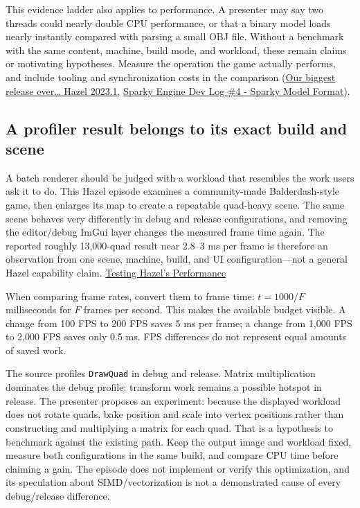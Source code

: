 This evidence ladder also applies to performance. A presenter may say two threads could nearly double CPU performance, or that a binary model loads nearly instantly compared with parsing a small OBJ file. Without a benchmark with the same content, machine, build mode, and workload, these remain claims or motivating hypotheses. Measure the operation the game actually performs, and include tooling and synchronization costs in the comparison (\href{https://www.youtube.com/watch?v=L_XLGmG2Ct8&t=1m12s}{Our biggest release ever\ldots{} Hazel 2023.1}, \href{https://www.youtube.com/watch?v=EUy8G3uMitI&t=4m30s}{Sparky Engine Dev Log \#4 - Sparky Model Format}).

\subsection{A profiler result belongs to its exact build and scene}\label{06-engine-ii-ch041-a-profiler-result-belongs-to-its-exact-build-and-scene}

A batch renderer should be judged with a workload that resembles the work users ask it to do. This Hazel episode examines a community-made Balderdash-style game, then enlarges its map to create a repeatable quad-heavy scene. The same scene behaves very differently in debug and release configurations, and removing the editor/debug ImGui layer changes the measured frame time again. The reported roughly 13,000-quad result near 2.8--3 ms per frame is therefore an observation from one scene, machine, build, and UI configuration---not a general Hazel capability claim. \href{https://www.youtube.com/watch?v=Yw7RpvmqvSE}{Testing Hazel's Performance}

When comparing frame rates, convert them to frame time: \(t=1000/F\) milliseconds for \(F\) frames per second. This makes the available budget visible. A change from 100 FPS to 200 FPS saves 5 ms per frame; a change from 1,000 FPS to 2,000 FPS saves only 0.5 ms. FPS differences do not represent equal amounts of saved work.

The source profiles \texttt{DrawQuad} in debug and release. Matrix multiplication dominates the debug profile; transform work remains a possible hotspot in release. The presenter proposes an experiment: because the displayed workload does not rotate quads, bake position and scale into vertex positions rather than constructing and multiplying a matrix for each quad. That is a hypothesis to benchmark against the existing path. Keep the output image and workload fixed, measure both configurations in the same build, and compare CPU time before claiming a gain. The episode does not implement or verify this optimization, and its speculation about SIMD/vectorization is not a demonstrated cause of every debug/release difference.

